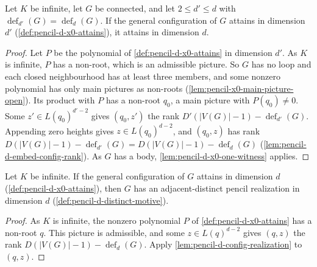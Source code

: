 \begin{lemma}
  \label{lem:pencil-d-x0-attains-of-le}
  \leanok
  Let $K$ be infinite, let $G$ be connected, and let $2 \le d' \le d$
  with $\operatorname{def}_{d'}(G) = \operatorname{def}_d(G)$. If the
  general configuration of $G$ attains in dimension $d'$
  (\cref{def:pencil-d-x0-attains}), it attains in dimension $d$.
\end{lemma}
\begin{proof}
  \leanok
  Let $P$ be the polynomial of \cref{def:pencil-d-x0-attains} in
  dimension $d'$. As $K$ is infinite, $P$ has a non-root, which is an
  admissible picture. So $G$ has no loop and each closed neighbourhood
  has at least three members, and some nonzero polynomial has only main
  pictures as non-roots (\cref{lem:pencil-x0-main-picture-open}). Its
  product with $P$ has a non-root $q_0$, a main picture with
  $P(q_0) \neq 0$. Some $z' \in L(q_0)^{d'-2}$ gives $(q_0, z')$ the rank
  $D'(|V(G)| - 1) - \operatorname{def}_{d'}(G)$. Appending zero heights
  gives $z \in L(q_0)^{d-2}$, and $(q_0, z)$ has rank
  $D(|V(G)| - 1) - \operatorname{def}_{d'}(G)
  = D(|V(G)| - 1) - \operatorname{def}_d(G)$
  (\cref{lem:pencil-d-embed-config-rank}). As $G$ has a body,
  \cref{lem:pencil-d-x0-one-witness} applies.
\end{proof}

\begin{lemma}
  \label{lem:pencil-d-x0-attains-distinct}
  \leanok
  Let $K$ be infinite. If the general configuration of $G$ attains in
  dimension $d$ (\cref{def:pencil-d-x0-attains}), then $G$ has an
  adjacent-distinct pencil realization in dimension $d$
  (\cref{def:pencil-d-distinct-motive}).
\end{lemma}
\begin{proof}
  \leanok
  As $K$ is infinite, the nonzero polynomial $P$ of
  \cref{def:pencil-d-x0-attains} has a non-root $q$. This picture is
  admissible, and some $z \in L(q)^{d-2}$ gives $(q, z)$ the rank
  $D(|V(G)| - 1) - \operatorname{def}_d(G)$. Apply
  \cref{lem:pencil-d-config-realization} to $(q, z)$.
\end{proof}

